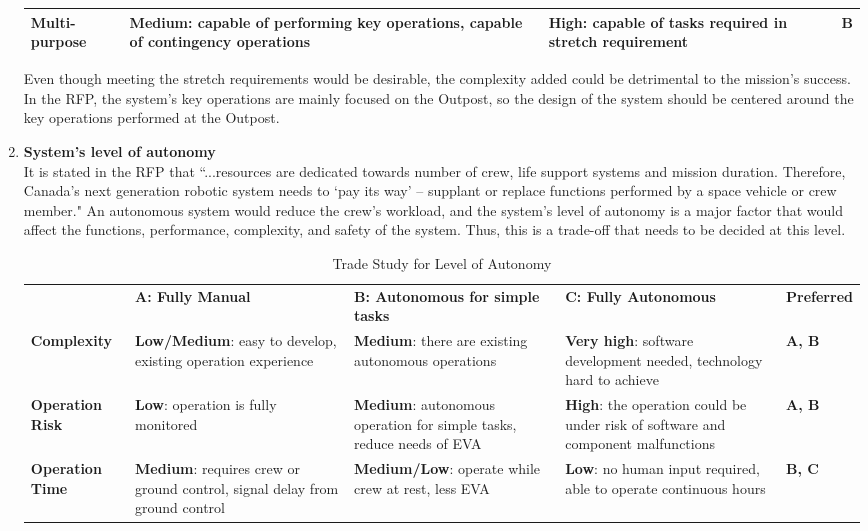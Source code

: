 \documentclass[12pt, letter]{article}
\begin{document}
\begin{enumerate}
{\begin{table}[H]
\begin{tabular}{|P{3cm}|P{4.3cm}|P{4.3cm}|l|}
\textbf{Multi-purpose}	&	\textbf{Medium}: capable of performing key operations, capable of contingency operations	&	\textbf{High}: capable of tasks required in stretch requirement	&	\textbf{B}	\\\hline
\end{tabular}
\end{table}
Even though meeting the stretch requirements would be desirable, the complexity added could be detrimental to the mission's success. In the RFP, the system's key operations are mainly focused on the Outpost\cite{RFP}, so the design of the system should be centered around the key operations performed at the Outpost.}
\item{\textbf{System's level of autonomy}\\
It is stated in the RFP that ``...resources are dedicated towards number of crew, life support systems and mission duration. Therefore, Canada's next generation robotic system needs to `pay its way' -- supplant or replace functions performed by a space vehicle or crew member."\cite{RFP} An autonomous system would reduce the crew's workload, and the system's level of autonomy is a major factor that would affect the functions, performance, complexity, and safety of the system.\cite{rob_sys}\cite{safety_issues} Thus, this is a trade-off that needs to be decided at this level.
\begin{table}[H]
\centering
\caption{Trade Study for Level of Autonomy}
\begin{tabular}{|P{2.2cm}|P{3.5cm}|P{3.5cm}|P{3.5cm}|l|}
\hline
	&	\textbf{A: Fully Manual}	&	\textbf{B: Autonomous for simple tasks}&	\textbf{C: Fully Autonomous}	&	\textbf{Preferred}	\\\hhline{|=|=|=|=|=|}
\textbf{Complexity}	&	\textbf{Low/Medium}: easy to develop, existing operation experience\cite{ISS_ass}	&	\textbf{Medium}: there are existing autonomous operations\cite{ISS_ass}&	\textbf{Very high}: software development needed, technology hard to achieve\cite{rob_sys}	&	\textbf{A, B}	\\\hline
\textbf{Operation Risk}	&	\textbf{Low}: operation is fully monitored	&	\textbf{Medium}: autonomous operation for simple tasks, reduce needs of EVA\cite{rob_sys}&	\textbf{High}: the operation could be under risk of software and component malfunctions\cite{safety_issues}	&	\textbf{A, B}	\\\hline
\textbf{Operation Time}	&	\textbf{Medium}: requires crew or ground control, signal delay from ground control	&	\textbf{Medium/Low}: operate while crew at rest, less EVA	&	\textbf{Low}: no human input required, able to operate continuous hours	&	\textbf{B, C}	\\\hline

\end{tabular}
\end{table}}
\end{enumerate}
\end{document}
